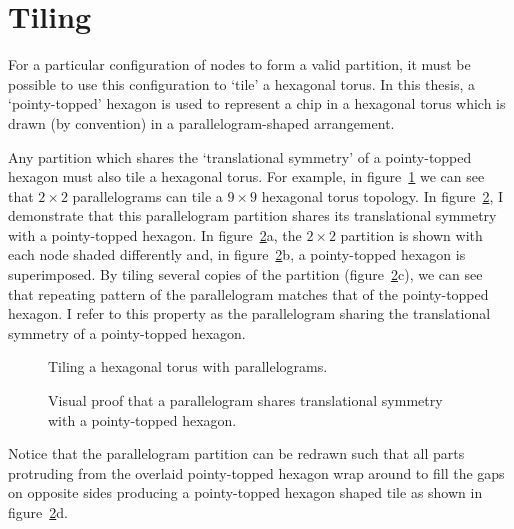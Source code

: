 	\section{Tiling}
		
		For a particular configuration of nodes to form a valid partition, it must
		be possible to use this configuration to `tile' a hexagonal torus. In this
		thesis, a `pointy-topped' hexagon is used to represent a chip in a
		hexagonal torus which is drawn (by convention) in a parallelogram-shaped
		arrangement.
		
		Any partition which shares the `translational symmetry' of a pointy-topped
		hexagon must also tile a hexagonal torus. For example, in
		figure~\ref{fig:tiling-a-torus} we can see that $2\times2$ parallelograms
		can tile a $9\times9$ hexagonal torus topology.  In
		figure~\ref{fig:parallelogram-tiling}, I demonstrate that this
		parallelogram partition shares its translational symmetry with a
		pointy-topped hexagon. In figure~\ref{fig:parallelogram-tiling}a, the
		$2\times2$ partition is shown with each node shaded differently and, in
		figure~\ref{fig:parallelogram-tiling}b, a pointy-topped hexagon is
		superimposed. By tiling several copies of the partition
		(figure~\ref{fig:parallelogram-tiling}c), we can see that repeating pattern
		of the parallelogram matches that of the pointy-topped hexagon. I refer to
		this property as the parallelogram sharing the translational symmetry of a
		pointy-topped hexagon.
		
		\begin{figure}
			\center
			
			\caption{Tiling a hexagonal torus with parallelograms.}
			\label{fig:tiling-a-torus}
		\end{figure}
		
		\begin{figure}
			\center
			
			\caption[A parallelogram tiles a hexagonal torus.]%
			{Visual proof that a parallelogram shares translational symmetry
			with a pointy-topped hexagon.}
			\label{fig:parallelogram-tiling}
		\end{figure}
		
		Notice that the parallelogram partition can be redrawn such that all parts
		protruding from the overlaid pointy-topped hexagon wrap around to fill the
		gaps on opposite sides producing a pointy-topped hexagon shaped tile as
		shown in figure~\ref{fig:parallelogram-tiling}d.
		
